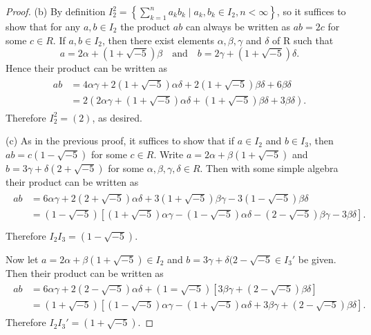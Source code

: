 \documentclass[10pt]{amsart}
\begin{document}
\begin{thm}
\begin{proof}
    (b) By definition \(I_2^2 = \left\{ \sum_{k=1}^{n} a_kb_k\mid a_k,b_k \in I_2, n < \infty \right\}\), so it suffices to show that for any \(a,b \in I_2\) the product \(ab\) can always be written as \(ab = 2c\) for some \(c \in R\).
    If \(a,b \in I_2\), then there exist elements \(\alpha, \beta, \gamma\) and \(\delta\) of R such that \[a = 2\alpha + (1 + \sqrt{-5})\beta \quad \text{and} \quad b = 2\gamma + (1 + \sqrt{-5})\delta.\]
    Hence their product can be written as 
    \begin{align*}
      \begin{split}
        ab &= 4\alpha\gamma + 2(1 + \sqrt{-5})\alpha\delta + 2(1 + \sqrt{-5})\beta\delta + 6\beta\delta\\
        & = 2(2\alpha\gamma + (1 + \sqrt{-5})\alpha\delta + (1 + \sqrt{-5})\beta\delta + 3\beta\delta).
      \end{split}
    \end{align*}
    Therefore \(I_2^2 = (2)\), as desired.

    (c) As in the previous proof, it suffices to show that if \(a \in I_2\) and \(b \in I_3\), then \(ab = c(1 - \sqrt{-5})\) for some \(c \in R\).
    Write \(a = 2\alpha + \beta(1 + \sqrt{-5})\) and \(b = 3\gamma + \delta(2 + \sqrt{-5})\) for some \(\alpha, \beta, \gamma, \delta \in R\).
    Then with some simple algebra their product can be written as
    \begin{align*}
      \begin{split}
        ab &= 6\alpha\gamma + 2(2 + \sqrt{-5})\alpha\delta + 3(1 + \sqrt{-5})\beta\gamma - 3(1-\sqrt{-5})\beta\delta\\
        &= (1 - \sqrt{-5})[(1 + \sqrt{-5})\alpha\gamma - (1-\sqrt{-5})\alpha\delta - (2 - \sqrt{-5})\beta\gamma - 3\beta\delta].\\
      \end{split}
    \end{align*}
    Therefore \(I_2I_3 = (1 - \sqrt{-5})\).

    
    Now let \(a = 2\alpha + \beta(1 + \sqrt{-5}) \in I_2\) and \(b  = 3\gamma + \delta(2 - \sqrt{-5} \in I_3'\) be given.
    Then their product can be written as 
    \begin{align*}
      \begin{split}
        ab &= 6\alpha\gamma + 2(2 - \sqrt{-5})\alpha\delta + (1 = \sqrt{-5})[3\beta\gamma + (2 - \sqrt{-5})\beta\delta]\\
        &= (1 + \sqrt{-5})[(1 - \sqrt{-5})\alpha\gamma - (1+\sqrt{-5})\alpha\delta + 3\beta\gamma + (2 - \sqrt{-5})\beta\delta].
      \end{split}
    \end{align*}
    Therefore \(I_2I_3' = (1 + \sqrt{-5})\).


\end{proof}
\end{thm}
\end{document}
